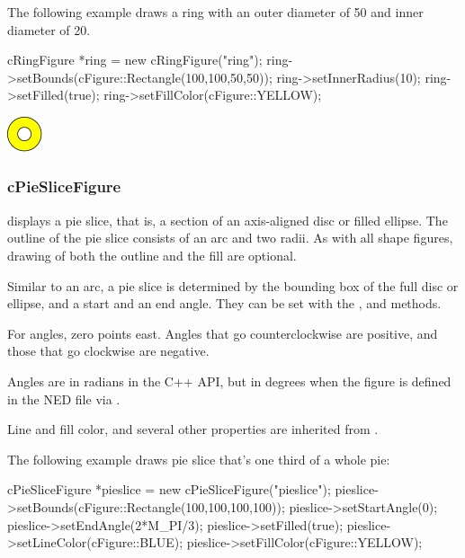 The following example draws a ring with an outer diameter of 50 and
inner diameter of 20.

\begin{cpp}
cRingFigure *ring = new cRingFigure("ring");
ring->setBounds(cFigure::Rectangle(100,100,50,50));
ring->setInnerRadius(10);
ring->setFilled(true);
ring->setFillColor(cFigure::YELLOW);
\end{cpp}


\begin{center}
\includegraphics[scale=4.0]{figures/figure-ring}
\end{center}


\subsubsection{cPieSliceFigure}

 displays a pie slice, that is, a section of an
axis-aligned disc or filled ellipse.  The outline of the pie slice consists
of an arc and two radii. As with all shape figures, drawing of both the
outline and the fill are optional.

Similar to an arc, a pie slice is determined by the bounding box of the
full disc or ellipse, and a start and an end angle. They can be set with
the ,  and 
methods.

For angles, zero points east. Angles that go counterclockwise are
positive, and those that go clockwise are negative.

\begin{note}
Angles are in radians in the C++ API, but in degrees when the figure is
defined in the NED file via .
\end{note}

Line and fill color, and several other properties are inherited from
.

The following example draws pie slice that's one third of a whole pie:

\begin{cpp}
cPieSliceFigure *pieslice = new cPieSliceFigure("pieslice");
pieslice->setBounds(cFigure::Rectangle(100,100,100,100));
pieslice->setStartAngle(0);
pieslice->setEndAngle(2*M_PI/3);
pieslice->setFilled(true);
pieslice->setLineColor(cFigure::BLUE);
pieslice->setFillColor(cFigure::YELLOW);
\end{cpp}

